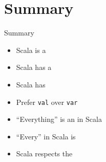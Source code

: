 \section{Summary}
\begin{frame}{Summary}
\begin{itemize}
  \item Scala is a 
  \item Scala has a 
  \item Scala has 
  \item Prefer \lstinline!val! over \lstinline!var!
  \item ``Everything'' is an  in Scala
  \item ``Every''  in Scala is 
  \item Scala respects the 
\end{itemize}
\end{frame}